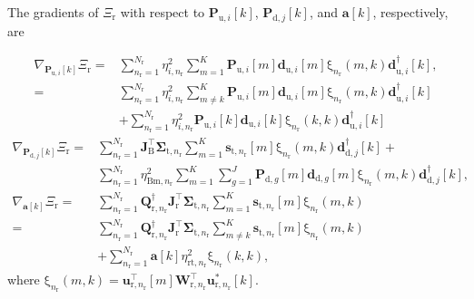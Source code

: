 \documentclass[9pt,journal]{IEEEtran}
\newcommand{\paren}[1]{\left({#1}\right)}
\newcommand{\bracket}[1]{{\left [{#1}\right ]}}
\newcommand{\rr}{_\mathrm{r}}
\newcommand{\rnr}{_{\mathrm{r},n_\mathrm{r}}}
\newcommand{\target}{\mathrm{t}}
\newcommand{\sigmanr}{\boldsymbol{\Sigma}_{\textrm{t},n\rr}}
\newcommand{\PiB}{\mathbf{P}_{\textrm{u},i}\bracket{k}}
\newcommand{\PBj}{\mathbf{P}_{\textrm{d},j}\bracket{k}}
\theoremstyle{definition}
\begin{document}
{The gradients of $\Xi_{\text{r}}$ with respect to $\PiB$, $\PBj$, and $\mathbf{a}\bracket{k}$, respectively, are \par\noindent\small
\begin{align}
\nabla_{\PiB}\Xi_{\text{r}}=&\sum_{n\rr=1}^{\mathit{N}\rr}\eta^2_{i,n\rr}\sum_{m=1}^{\mathrm{\mathit{K}}}\mathbf{P}_{\textrm{u},i}\bracket{m}\mathbf{d}_{\textrm{u},i}\bracket{m}\mathrm{\xi}_{n\rr}\paren{m,k}\mathbf{d}^\dagger_{\textrm{u},i}\bracket{k},\nonumber\\
=&\sum_{n\rr=1}^{\mathit{N}\rr}\eta^2_{i,n\rr}\sum_{m\neq k}^{\mathrm{\mathit{K}}}\mathbf{P}_{\textrm{u},i}\bracket{m}\mathbf{d}_{\textrm{u},i}\bracket{m}\mathrm{\xi}_{n\rr}\paren{m,k}\mathbf{d}^\dagger_{\textrm{u},i}\bracket{k}\nonumber\\
&+\sum_{n\rr=1}^{\mathit{N}\rr}\eta^2_{i,n\rr}\mathbf{P}_{\textrm{u},i}\bracket{k}\mathbf{d}_{\textrm{u},i}\bracket{k}\mathrm{\xi}_{n\rr}\paren{k,k}\mathbf{d}^\dagger_{\textrm{u},i}\bracket{k}\nonumber
\end{align}
\begin{align}
\nabla_{\PBj}\Xi_{\text{r}}
=&\sum_{n\rr=1}^{\mathit{N}\rr}\mathbf{J}^\top_{\textrm{B}}\sigmanr\sum_{m=1}^{\mathrm{\mathit{K}}}\mathbf{s}_{\target,n\rr}\bracket{m}\mathrm{\xi}_{n\rr}\paren{m,k}\mathbf{d}^\dagger_{\textrm{d},j}\bracket{k}+\nonumber\\
&\sum_{n\rr=1}^{\mathit{N}\rr}\eta^2_{\textrm{Bm},n\rr}\sum_{m=1}^{\mathrm{\mathit{K}}}\sum_{g=1}^{\mathit{J}}\mathbf{P}_{\textrm{d},g}\bracket{m}\mathbf{d}_{\textrm{d},g}\bracket{m}\mathrm{\xi}_{n\rr}\paren{m,k}\mathbf{d}^\dagger_{\textrm{d},j}\bracket{k},\nonumber\\
\nabla_{\mathbf{a}\bracket{k}}\Xi_{\text{r}}=& \sum_{n\rr=1}^{\mathit{N}\rr}\mathbf{Q}^\dagger\rnr\mathbf{J}^\top_{\textrm{r}}\sigmanr\sum_{m=1}^{\mathrm{\mathit{K}}}\mathbf{s}_{\target,n\rr}\bracket{m}\mathrm{\xi}_{n\rr}\paren{m,k}\nonumber\\
=&\sum_{n\rr=1}^{\mathit{N}\rr}\mathbf{Q}^\dagger\rnr\mathbf{J}^\top_{\textrm{r}}\sigmanr\sum_{m\neq k}^{\mathrm{\mathit{K}}}\mathbf{s}_{\target,n\rr}\bracket{m}\mathrm{\xi}_{n\rr}\paren{m,k}\nonumber\\
&+\sum_{n\rr=1}^{\mathit{N}\rr}\mathbf{a}\bracket{k}\eta^2_{\textrm{rt},n\rr}\mathrm{\xi}_{n\rr}\paren{k,k},\nonumber
\end{align}\normalsize
where  $\mathrm{\xi}_{n\rr}\paren{m,k}=\mathbf{u}^\top_{\textrm{r},n\rr}\bracket{m}\mathbf{W}^\top\rnr\mathbf{u}^\ast_{\textrm{r},n\rr}\bracket{k}$.
}
\end{document}
